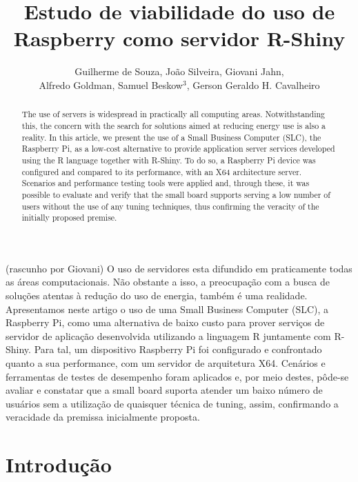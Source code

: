 \documentclass[12pt,english,brazil]{article}
\title{Estudo de viabilidade do uso de Raspberry como servidor R-Shiny}
\author{Guilherme de Souza\inst{1}, João Silveira\inst{1}, Giovani Jahn\inst{1}, \\Alfredo Goldman\inst{2}, Samuel Beskow$^3$, Gerson Geraldo H. Cavalheiro\inst{1}}
\begin{document}
 

\maketitle
    
\en
\begin{abstract}
The use of servers is widespread in practically all computing areas. Notwithstanding this, the concern with the search for solutions aimed at reducing energy use is also a reality. In this article, we present the use of a Small Business Computer (SLC), the Raspberry Pi, as a low-cost alternative to provide application server services developed using the R language together with R-Shiny. To do so, a Raspberry Pi device was configured and compared to its performance, with an X64 architecture server. Scenarios and performance testing tools were applied and, through these, it was possible to evaluate and verify that the small board supports serving a low number of users without the use of any tuning techniques, thus confirming the veracity of the initially proposed premise.

\end{abstract}

\begin{resumo} (rascunho por Giovani)
O uso de servidores esta difundido em praticamente todas as áreas computacionais. Não obstante a isso, a preocupação com a busca de soluções atentas à redução do uso de energia, também é uma realidade.  Apresentamos neste artigo o uso de uma Small Business Computer (SLC), a Raspberry Pi, como uma alternativa de baixo custo para prover serviços de servidor de aplicação desenvolvida utilizando a linguagem R juntamente com R-Shiny. Para tal, um dispositivo Raspberry Pi foi configurado e confrontado quanto a sua performance, com um servidor de arquitetura X64. Cenários e ferramentas de testes de desempenho foram aplicados e, por meio destes, pôde-se avaliar e constatar que a small board suporta atender um baixo número de usuários sem a utilização de quaisquer técnica de tuning, assim, confirmando a veracidade da premissa inicialmente proposta.


\end{resumo}



\section{Introdução}
\end{document}

